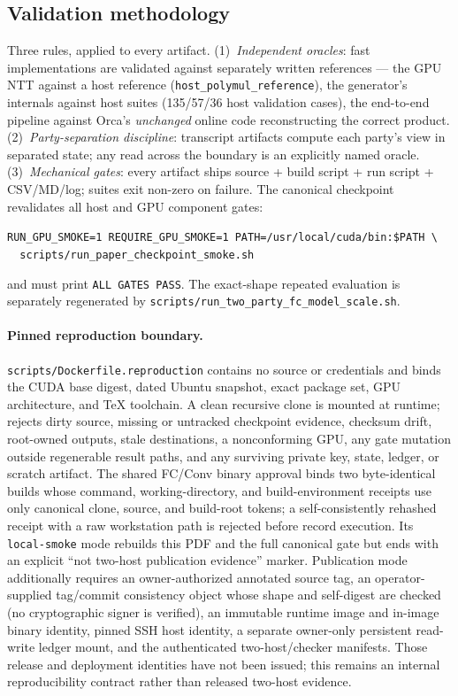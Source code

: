 \documentclass[11pt]{article}
\begin{document}
\subsection{Validation methodology}
\label{sec:methodology}

Three rules, applied to every artifact. (1)~\emph{Independent oracles}: fast
implementations are validated against separately written references --- the
GPU NTT against a host reference (\texttt{host\_polymul\_reference}), the
generator's internals against host suites (135/57/36 host validation cases),
the end-to-end pipeline against Orca's \emph{unchanged} online code
reconstructing the correct product. (2)~\emph{Party-separation discipline}:
transcript artifacts compute each party's view in separated state; any read
across the boundary is an explicitly named oracle. (3)~\emph{Mechanical
gates}: every artifact ships source + build script + run script + CSV/MD/log;
suites exit non-zero on failure. The canonical checkpoint revalidates all host
and GPU component gates:
\begin{center}
{\small\verb+RUN_GPU_SMOKE=1 REQUIRE_GPU_SMOKE=1 PATH=/usr/local/cuda/bin:$PATH \+}\\
{\small\verb+  scripts/run_paper_checkpoint_smoke.sh+}
\end{center}
and must print \texttt{ALL GATES PASS}. The exact-shape repeated evaluation is
separately regenerated by \texttt{scripts/run\_two\_party\_fc\_model\_scale.sh}.

\paragraph{Pinned reproduction boundary.}
\texttt{scripts/Dockerfile.reproduction} contains no source or credentials and
binds the CUDA base digest, dated Ubuntu snapshot, exact package set, GPU
architecture, and TeX toolchain. A clean recursive clone is mounted at runtime;
 rejects dirty source, missing or
untracked checkpoint evidence, checksum drift, root-owned outputs, stale
destinations, a nonconforming GPU, any gate mutation outside regenerable
result paths, and any surviving private key, state, ledger, or scratch
artifact. The shared FC/Conv binary approval binds two byte-identical builds
whose command, working-directory, and build-environment receipts use only
canonical clone, source, and build-root tokens; a self-consistently rehashed
receipt with a raw workstation path is rejected before record execution. Its
\texttt{local-smoke} mode rebuilds this PDF and the full canonical gate but
ends with an explicit ``not two-host publication evidence'' marker. Publication
mode additionally requires an owner-authorized annotated source tag, an
operator-supplied tag/commit consistency object whose shape and self-digest are
checked (no cryptographic signer is verified), an immutable runtime image and
in-image binary identity, pinned SSH host identity, a separate owner-only
persistent read-write ledger mount, and the authenticated two-host/checker
manifests. Those release and deployment identities have not
been issued; this remains an internal reproducibility contract rather than
released two-host evidence.
\end{document}
